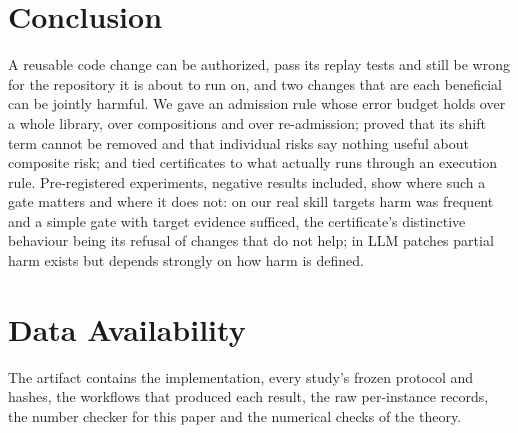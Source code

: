 \section{Conclusion}
\label{sec:conclusion}
A reusable code change can be authorized, pass its replay tests and still be wrong for the repository it is about to run on, and two
changes that are each beneficial can be jointly harmful.  We gave an admission rule whose error budget holds over a whole library,
over compositions and over re-admission; proved that its shift term cannot be removed and that individual risks say nothing useful
about composite risk; and tied certificates to what actually runs through an execution rule.  Pre-registered experiments, negative
results included, show where such a gate matters and where it does not: on our real skill targets harm was frequent and a simple gate
with target evidence sufficed, the certificate's distinctive behaviour being its refusal of changes that do not help; in LLM patches
partial harm exists but depends strongly on how harm is defined.

\section*{Data Availability}
The artifact contains the implementation, every study's frozen protocol and hashes, the workflows that produced each result, the raw
per-instance records, the number checker for this paper and the numerical checks of the theory.
